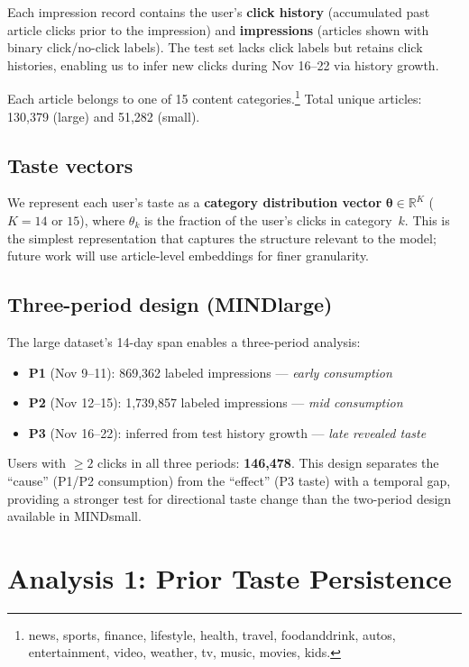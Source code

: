 \documentclass[11pt]{article}
\begin{document}
Each impression record contains the user's \textbf{click history} (accumulated past article clicks prior to the impression) and \textbf{impressions} (articles shown with binary click/no-click labels). The test set lacks click labels but retains click histories, enabling us to infer new clicks during Nov 16--22 via history growth.

Each article belongs to one of 15 content categories.\footnote{news, sports, finance, lifestyle, health, travel, foodanddrink, autos, entertainment, video, weather, tv, music, movies, kids.} Total unique articles: 130,379 (large) and 51,282 (small).

\subsection{Taste vectors}

We represent each user's taste as a \textbf{category distribution vector} $\boldsymbol{\theta} \in \mathbb{R}^{K}$ ($K = 14$ or $15$), where $\theta_k$ is the fraction of the user's clicks in category~$k$. This is the simplest representation that captures the structure relevant to the model; future work will use article-level embeddings for finer granularity.

\subsection{Three-period design (MINDlarge)}

The large dataset's 14-day span enables a three-period analysis:
\begin{itemize}
    \item \textbf{P1} (Nov 9--11): 869,362 labeled impressions --- \emph{early consumption}
    \item \textbf{P2} (Nov 12--15): 1,739,857 labeled impressions --- \emph{mid consumption}
    \item \textbf{P3} (Nov 16--22): inferred from test history growth --- \emph{late revealed taste}
\end{itemize}
Users with $\geq 2$ clicks in all three periods: \textbf{146,478}. This design separates the ``cause'' (P1/P2 consumption) from the ``effect'' (P3 taste) with a temporal gap, providing a stronger test for directional taste change than the two-period design available in MINDsmall.

\section{Analysis 1: Prior Taste Persistence}
\end{document}
